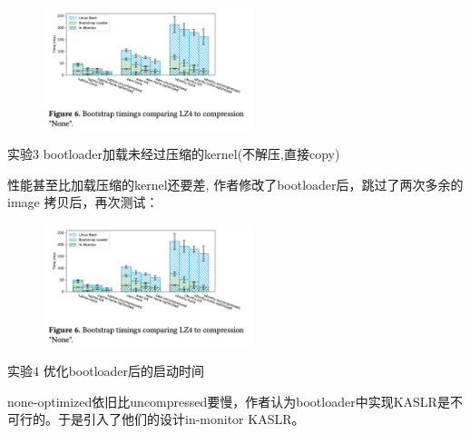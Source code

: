 \documentclass[
    aspectratio=169,  %
]{ctexbeamer}
\begin{document}
\begin{frame}

  \begin{figure}
  	\centering
  	\includegraphics[width=0.55\textwidth]{img/no_compress.png}
  \end{figure}
  
\begin{block}{实验3}
  bootloader加载未经过压缩的kernel(不解压,直接copy)
\end{block}

性能甚至比加载压缩的kernel还要差, 作者修改了bootloader后，跳过了两次多余的image 拷贝后，再次测试：
\end{frame}

\begin{frame}
  \begin{figure}
  	\centering
  	\includegraphics[width=0.55\textwidth]{img/no_compress.png}
  \end{figure}
\begin{block}{实验4}
  优化bootloader后的启动时间
\end{block}
  none-optimized依旧比uncompressed要慢，作者认为bootloader中实现KASLR是不可行的。于是引入了他们的设计in-monitor KASLR。
\end{frame}
\end{document}
